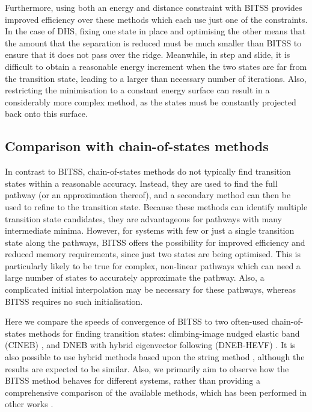 \documentclass[aip,jcp,reprint,twocolumn]{revtex4-1}
\begin{document}
Furthermore, using both an energy and distance constraint with BITSS provides improved efficiency over these methods which each use just one of the constraints.
In the case of DHS, fixing one state in place and optimising the other means that the amount that the separation is reduced must be much smaller than BITSS to ensure that it does not pass over the ridge.
Meanwhile, in step and slide, it is difficult to obtain a reasonable energy increment when the two states are far from the transition state, leading to a larger than necessary number of iterations.
Also, restricting the minimisation to a constant energy surface can result in a considerably more complex method, as the states must be constantly projected back onto this surface.


\subsection{Comparison with chain-of-states methods}
In contrast to BITSS, chain-of-states methods do not typically find transition states within a reasonable accuracy.
Instead, they are used to find the full pathway (or an approximation thereof), and a secondary method can then be used to refine to the transition state.
Because these methods can identify multiple transition state candidates, they are advantageous for pathways with many intermediate minima.
However, for systems with few or just a single transition state along the pathways, BITSS offers the possibility for improved efficiency and reduced memory requirements, since just two states are being optimised.
This is particularly likely to be true for complex, non-linear pathways which can need a large number of states to accurately approximate the pathway.
Also, a complicated initial interpolation may be necessary for these pathways, whereas BITSS requires no such initialisation.

Here we compare the speeds of convergence of BITSS to two often-used chain-of-states methods for finding transition states: climbing-image nudged elastic band (CINEB) \cite{Henkelman2000a}, and DNEB with hybrid eigenvector following (DNEB-HEVF) \cite{Cerjan1981}.
It is also possible to use hybrid methods based upon the string method \cite{E2007,Zimmerman2013}, although the results are expected to be similar.
Also, we primarily aim to observe how the BITSS method behaves for different systems, rather than providing a comprehensive comparison of the available methods, which has been performed in other works \cite{Koslover2007,Sheppard2008}.
\end{document}
